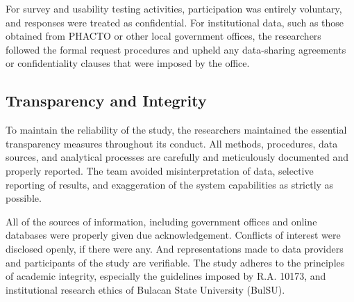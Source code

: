 For survey and usability testing activities, participation was entirely voluntary, and responses were treated as confidential. For institutional data, such as those obtained from PHACTO or other local government offices, the researchers followed the formal request procedures and upheld any data-sharing agreements or confidentiality clauses that were imposed by the office.


\subsection{Transparency and Integrity}
To maintain the reliability of the study, the researchers maintained the essential transparency measures throughout its conduct. All methods, procedures, data sources, and analytical processes are carefully and meticulously documented and properly reported. The team avoided misinterpretation of data, selective reporting of results, and exaggeration of the system capabilities as strictly as possible.

All of the sources of information, including government offices and online databases were properly given due acknowledgement. Conflicts of interest were disclosed openly, if there were any. And representations made to data providers and participants of the study are verifiable. The study adheres to the principles of academic integrity, especially the guidelines imposed by R.A. 10173, and institutional research ethics of Bulacan State University (BulSU).
